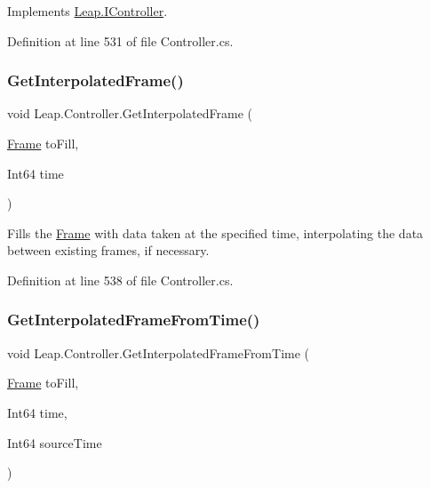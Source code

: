 Implements \mbox{\hyperlink{interface_leap_1_1_i_controller_a47758a602643bb7d6db92e024b334009}{Leap.\+I\+Controller}}.



Definition at line 531 of file Controller.\+cs.

\mbox{\label{class_leap_1_1_controller_a44c7a28591b2dab45849aa03640b4889}} 
\subsubsection{\texorpdfstring{GetInterpolatedFrame()}{GetInterpolatedFrame()}\hspace{0.1cm}{\footnotesize\ttfamily [2/2]}}
{\footnotesize\ttfamily void Leap.\+Controller.\+Get\+Interpolated\+Frame (\begin{DoxyParamCaption}\item[{\mbox{\hyperlink{class_leap_1_1_frame}{Frame}}}]{to\+Fill,  }\item[{Int64}]{time }\end{DoxyParamCaption})}



Fills the \mbox{\hyperlink{class_leap_1_1_frame}{Frame}} with data taken at the specified time, interpolating the data between existing frames, if necessary. 



Definition at line 538 of file Controller.\+cs.

\mbox{\label{class_leap_1_1_controller_ae025d7fd3e26a385907af50732d5cf6f}} 
\subsubsection{\texorpdfstring{GetInterpolatedFrameFromTime()}{GetInterpolatedFrameFromTime()}}
{\footnotesize\ttfamily void Leap.\+Controller.\+Get\+Interpolated\+Frame\+From\+Time (\begin{DoxyParamCaption}\item[{\mbox{\hyperlink{class_leap_1_1_frame}{Frame}}}]{to\+Fill,  }\item[{Int64}]{time,  }\item[{Int64}]{source\+Time }\end{DoxyParamCaption})}



